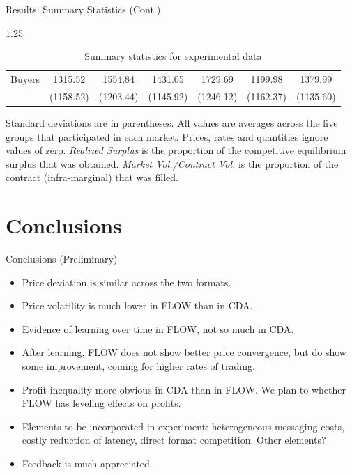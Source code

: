 \documentclass[10pt]{beamer}
\begin{document}
\begin{frame}{Results: Summary Statistics (Cont.)}
\begin{table}[H]
{\begin{threeparttable}
\begin{spacing}{1.25}
\begin{tabular}{lcccccc}
                 \hspace{3mm}Buyers               & 1315.52       & 1554.84       & 1431.05        & 1729.69    & 1199.98    & 1379.99      \\
                                                  & (1158.52)     & (1203.44)     & (1145.92)      & (1246.12)  & (1162.37)  & (1135.60)    \\
                \hline
                \hline
            \end{tabular}
            \end{spacing}
        \vspace{.5em}
        \caption{Summary statistics for experimental data}
        \begin{tablenotes}\noindent\justifying\scriptsize Standard deviations are in parentheses. All values are averages across the five groups that participated in each market. Prices, rates and quantities ignore values of zero. \textit{Realized Surplus} is the proportion of the competitive equilibrium surplus that was obtained. \textit{Market Vol./Contract Vol.} is the proportion of the contract (infra-marginal) that was filled. \end{tablenotes}
        \end{threeparttable}}
    \end{table}
\end{frame}

\section{Conclusions}
\begin{frame}{Conclusions (Preliminary)}
    \begin{itemize}
    \item Price deviation is similar across the two formats.
    \item Price volatility is much lower in FLOW than in CDA. 
    \item Evidence of learning over time in FLOW, not so much in CDA. 
    \item After learning, FLOW does not show better price convergence, but do show some improvement, coming for higher rates of trading.
    \item Profit inequality more obvious in CDA than in FLOW. We plan to whether FLOW has leveling effects on profits. 
    \item Elements to be incorporated in experiment: heterogeneous messaging costs, costly reduction of latency, direct format competition. Other elements?
    \item Feedback is much appreciated.
    \end{itemize} 
\end{frame}
\end{document}
